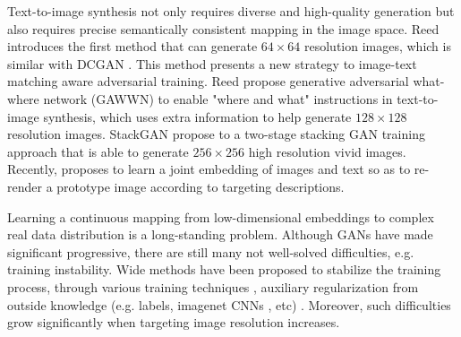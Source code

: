 \documentclass[10pt,twocolumn,letterpaper]{article}
\begin{document}
Text-to-image synthesis not only requires diverse and high-quality generation but also requires precise semantically consistent mapping in the image space.  Reed \etal \cite{reed2016generative} introduces the first method that can generate $64{\times}64$ resolution images, which is similar with DCGAN \cite{}. This method presents a new strategy to image-text matching aware adversarial training. Reed \etal \cite{reed2016learning} propose  generative
adversarial what-where network (GAWWN) to enable "where and what" instructions in text-to-image synthesis, which uses extra information to help generate $128{\times}128$ resolution images. StackGAN \etal \cite{han2017stackgan} propose to a two-stage stacking GAN training approach that is able to generate $256{\times}256$ high resolution vivid images. Recently, \cite{dong2017semantic} proposes to learn a joint embedding of images and text so as to re-render a prototype image according to targeting descriptions. 	
	
Learning a continuous mapping from low-dimensional embeddings to complex real data distribution is a long-standing problem. Although GANs have made significant progressive, there are still many not well-solved difficulties, e.g. training instability. Wide methods have been proposed to stabilize the training process, through various training techniques \cite{salimans2016improved,arjovsky2017wasserstein,berthelot2017began,shrivastava2016learning,odena2016conditional}, auxiliary regularization from outside knowledge (e.g. labels, imagenet CNNs , etc) \cite{dosovitskiy2016generating,ledig2016photo}. Moreover, such difficulties grow significantly when targeting image resolution increases.

\end{document}
